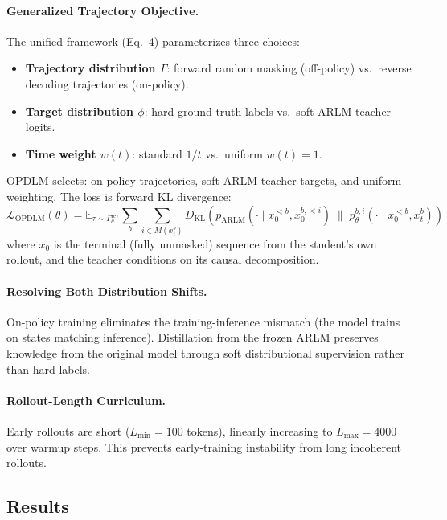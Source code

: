 \documentclass[11pt,a4paper]{article}
\begin{document}
\paragraph{Generalized Trajectory Objective.} The unified framework (Eq.~4) parameterizes three choices:
\begin{itemize}
\item \textbf{Trajectory distribution $\Gamma$}: forward random masking (off-policy) vs.\ reverse decoding trajectories (on-policy).
\item \textbf{Target distribution $\phi$}: hard ground-truth labels vs.\ soft ARLM teacher logits.
\item \textbf{Time weight $w(t)$}: standard $1/t$ vs.\ uniform $w(t)=1$.
\end{itemize}
OPDLM selects: on-policy trajectories, soft ARLM teacher targets, and uniform weighting. The loss is forward KL divergence:
\begin{equation}
\mathcal{L}_{\mathrm{OPDLM}}(\theta) = \mathbb{E}_{\tau \sim \Gamma_\theta^{\mathrm{rev}}} \sum_b \sum_{i \in M(x_t^b)} D_{\mathrm{KL}}\!\left(p_{\mathrm{ARLM}}(\cdot \mid x_0^{<b}, x_0^{b,<i}) \;\|\; p_\theta^{b,i}(\cdot \mid x_0^{<b}, x_t^b)\right)
\end{equation}
where $x_0$ is the terminal (fully unmasked) sequence from the student's own rollout, and the teacher conditions on its causal decomposition.

\paragraph{Resolving Both Distribution Shifts.}
On-policy training eliminates the training-inference mismatch (the model trains on states matching inference). Distillation from the frozen ARLM preserves knowledge from the original model through soft distributional supervision rather than hard labels.

\paragraph{Rollout-Length Curriculum.}
Early rollouts are short ($L_{\min} = 100$ tokens), linearly increasing to $L_{\max} = 4000$ over warmup steps. This prevents early-training instability from long incoherent rollouts.

\subsection{Results}
\end{document}
